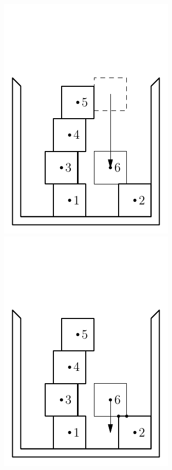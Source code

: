 \documentclass[12pt, sumlimits, intlimits]{article}
\begin{document}
\begin{figure}
\includegraphics[width=\w]{btr-7} \\
\includegraphics[width=\w]{btr-8}%

\end{figure}
\end{document}
